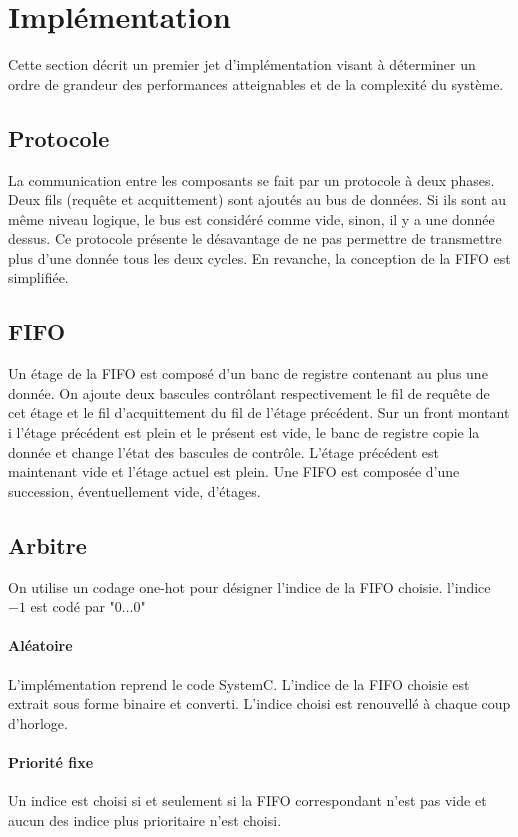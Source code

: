 \documentclass[11pt]{article}
\begin{document}
\section{Implémentation}

Cette section décrit un premier jet d'implémentation visant à déterminer un ordre de grandeur des performances atteignables et de la complexité du système.

\subsection{Protocole}
La communication entre les composants se fait par un protocole à deux phases. Deux fils (requête et acquittement) sont ajoutés au bus de données. Si ils sont au même niveau logique, le bus est considéré comme vide, sinon, il y a une donnée dessus. Ce protocole présente le désavantage de ne pas permettre de transmettre plus d'une donnée tous les deux cycles. En revanche, la conception de la FIFO est simplifiée.	

\subsection{FIFO}
Un étage de la FIFO est composé d'un banc de registre contenant au plus une donnée. On ajoute deux bascules contrôlant respectivement le fil de requête de cet étage et le fil d'acquittement du fil de l'étage précédent. Sur un front montant i l'étage précédent est plein et le présent est vide, le banc de registre copie la donnée et change l'état des bascules de contrôle. L'étage précédent est maintenant vide et l'étage actuel est plein.
Une FIFO est composée d'une succession, éventuellement vide, d'étages.

\subsection{Arbitre}
On utilise un codage one-hot pour désigner l'indice de la FIFO choisie. l'indice $-1$ est codé par "$0\dots0$"
\paragraph{Aléatoire}
L'implémentation reprend le code SystemC. L'indice de la FIFO choisie est extrait sous forme binaire et converti. L'indice choisi est renouvellé à chaque coup d'horloge.
\paragraph{Priorité fixe}
Un indice est choisi si et seulement si la FIFO correspondant n'est pas vide et aucun des indice plus prioritaire n'est choisi.
\end{document}
